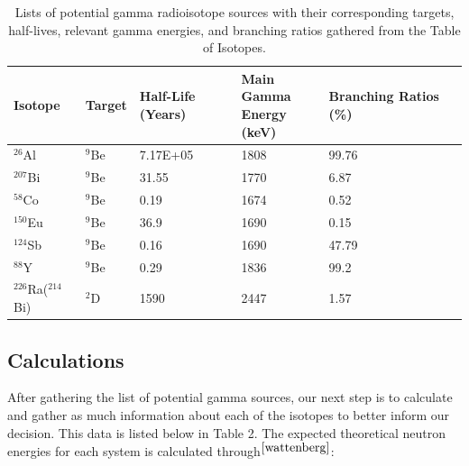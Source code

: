 \documentclass[%
12pt,
twoside,
reprint,
amsmath,amssymb,
aps,
]{article}
\begin{document}
	\begin{table}
		\begin{center}
		\scriptsize
		\begin{tabular}{l l l l l l}
			\hline
			\textbf{Isotope} & \textbf{Target} & \textbf{Half-Life (Years)} & \makecell{\textbf{Main Gamma} \\ \textbf{Energy (keV)}} & \textbf{Branching Ratios (\%)} \\ \hline
			$^{26}$Al            & $^{9}$Be           & 7.17E+05                   & 1808                             & 99.76                          \\ \hline
			$^{207}$Bi           & $^{9}$Be          & 31.55                      & 1770                             & 6.87                           \\ \hline
			$^{58}$Co            & $^{9}$Be            & 0.19                       & 1674                             & 0.52                           \\ \hline
			$^{150}$Eu           & $^{9}$Be           & 36.9                       & 1690                             & 0.15                           \\ \hline
			$^{124}$Sb           & $^{9}$Be           & 0.16                       & 1690                             & 47.79                          \\ \hline
			$^{88}$Y             & $^{9}$Be            & 0.29                       & 1836                             & 99.2                           \\ \hline
			$^{226}$Ra($^{214}$Bi)       & $^{2}$D              & 1590                       & 2447                             & 1.57                           \\ \hline
		\end{tabular}
		\caption{\label{tab:table-name} Lists of potential gamma radioisotope sources with their corresponding targets, half-lives, relevant gamma energies, and branching ratios gathered from the Table of Isotopes.}
	\end{center}
	\end{table}
		
	\subsection{Calculations}
	\par After gathering the list of potential gamma sources, our next step is to calculate and gather as much information about each of the isotopes to better inform our decision. This data is listed below in Table 2. The expected theoretical neutron energies for each system is calculated through$^{\cite{wattenberg}}$:
	
\end{document}
